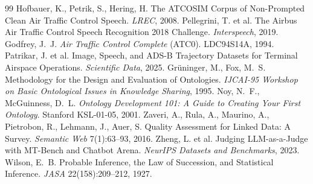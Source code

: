 \documentclass[10pt,a4paper]{article}
\begin{document}
\begin{thebibliography}{99}
 Hofbauer, K., Petrik, S., Hering, H. The ATCOSIM Corpus of Non-Prompted Clean Air Traffic Control Speech. \emph{LREC}, 2008.
 Pellegrini, T. et al. The Airbus Air Traffic Control Speech Recognition 2018 Challenge. \emph{Interspeech}, 2019.
 Godfrey, J.~J. \emph{Air Traffic Control Complete} (ATC0). LDC94S14A, 1994.
 Patrikar, J. et al. Image, Speech, and ADS-B Trajectory Datasets for Terminal Airspace Operations. \emph{Scientific Data}, 2025.
 Gr\"uninger, M., Fox, M.~S. Methodology for the Design and Evaluation of Ontologies. \emph{IJCAI-95 Workshop on Basic Ontological Issues in Knowledge Sharing}, 1995.
 Noy, N.~F., McGuinness, D.~L. \emph{Ontology Development 101: A Guide to Creating Your First Ontology}. Stanford KSL-01-05, 2001.
 Zaveri, A., Rula, A., Maurino, A., Pietrobon, R., Lehmann, J., Auer, S. Quality Assessment for Linked Data: A Survey. \emph{Semantic Web} 7(1):63--93, 2016.
 Zheng, L. et al. Judging LLM-as-a-Judge with MT-Bench and Chatbot Arena. \emph{NeurIPS Datasets and Benchmarks}, 2023.
 Wilson, E.~B. Probable Inference, the Law of Succession, and Statistical Inference. \emph{JASA} 22(158):209--212, 1927.
\end{thebibliography}
\end{document}
